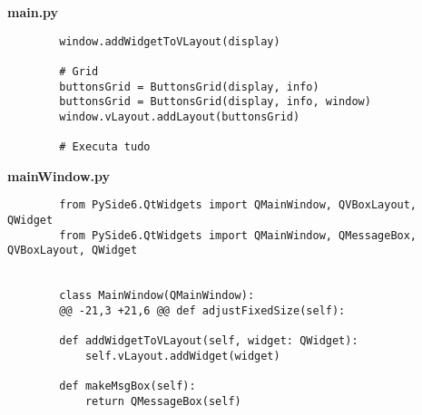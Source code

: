 \documentclass[12pt,a4paper]{article}
\begin{document}
    \textbf{main.py}
    \begin{lstlisting}
        window.addWidgetToVLayout(display)

        # Grid
        buttonsGrid = ButtonsGrid(display, info)
        buttonsGrid = ButtonsGrid(display, info, window)
        window.vLayout.addLayout(buttonsGrid)

        # Executa tudo
    \end{lstlisting}

    \textbf{mainWindow.py}
    \begin{lstlisting}
        from PySide6.QtWidgets import QMainWindow, QVBoxLayout, QWidget
        from PySide6.QtWidgets import QMainWindow, QMessageBox, QVBoxLayout, QWidget


        class MainWindow(QMainWindow):
        @@ -21,3 +21,6 @@ def adjustFixedSize(self):

        def addWidgetToVLayout(self, widget: QWidget):
            self.vLayout.addWidget(widget)

        def makeMsgBox(self):
            return QMessageBox(self)
    \end{lstlisting}
\end{document}
